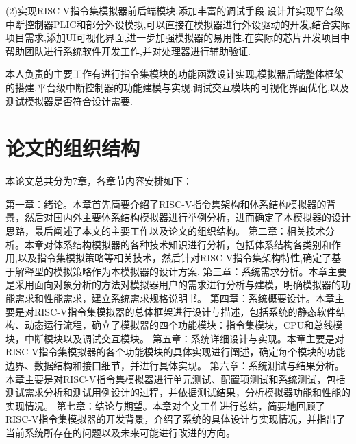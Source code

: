 (2)实现RISC-V指令集模拟器前后端模块,添加丰富的调试手段,设计并实现平台级中断控制器PLIC和部分外设模拟,可以直接在模拟器进行外设驱动的开发,结合实际项目需求,添加UI可视化界面,进一步加强模拟器的易用性.在实际的芯片开发项目中帮助团队进行系统软件开发工作,并对处理器进行辅助验证.


本人负责的主要工作有进行指令集模块的功能函数设计实现,模拟器后端整体框架的搭建,平台级中断控制器的功能建模与实现,调试交互模块的可视化界面优化,以及测试模拟器是否符合设计需要.


\section{论文的组织结构}
本论文总共分为7章，各章节内容安排如下：


第一章：绪论。本章首先简要介绍了RISC-V指令集架构和体系结构模拟器的背景，然后对国内外主要体系结构模拟器进行举例分析，进而确定了本模拟器的设计思路，最后阐述了本文的主要工作以及论文的组织结构。
第二章：相关技术分析。本章对体系结构模拟器的各种技术知识进行分析，包括体系结构各类别和作用,以及指令集模拟策略等相关技术，然后针对RISC-V指令集架构特性,确定了基于解释型的模拟策略作为本模拟器的设计方案.
第三章：系统需求分析。本章主要是采用面向对象分析的方法对模拟器用户的需求进行分析与建模，明确模拟器的功能需求和性能需求，建立系统需求规格说明书。
第四章：系统概要设计。本章主要是对RISC-V指令集模拟器的总体框架进行设计与描述，包括系统的静态软件结构、动态运行流程，确立了模拟器的四个功能模块：指令集模块，CPU和总线模块，中断模块以及调试交互模块。
第五章：系统详细设计与实现。本章主要是对RISC-V指令集模拟器的各个功能模块的具体实现进行阐述，确定每个模块的功能边界、数据结构和接口细节，并进行具体实现。
第六章：系统测试与结果分析。本章主要是对RISC-V指令集模拟器进行单元测试、配置项测试和系统测试，包括测试需求分析和测试用例设计的过程，并依据测试结果，分析模拟器功能和性能的实现情况。
第七章：结论与期望。本章对全文工作进行总结，简要地回顾了RISC-V指令集模拟器的开发背景，介绍了系统的具体设计与实现情况，并指出了当前系统所存在的问题以及未来可能进行改进的方向。


